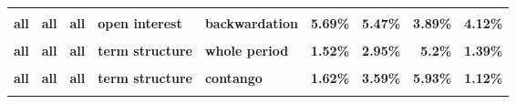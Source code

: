 \documentclass[
  authoryear,
  preprint,
  3p]{elsarticle}
\begin{document}
\begin{landscape}
\begin{longtable}[t]{>{}l>{}l>{}l>{}l>{}l>{}r>{}r>{}r>{}r}
\textbf{\cellcolor{gray!10}{all}} & \textbf{\cellcolor{gray!10}{all}} & \textbf{\cellcolor{gray!10}{all}} & \textbf{\cellcolor{gray!10}{open interest}} & \textbf{\cellcolor{gray!10}{whole period}} & \textcolor[HTML]{4285f4}{\textbf{\cellcolor{gray!10}{5.98\%}}} & \textcolor[HTML]{4285f4}{\textbf{\cellcolor{gray!10}{5.63\%}}} & \textcolor[HTML]{4285f4}{\textbf{\cellcolor{gray!10}{4.09\%}}} & \textcolor[HTML]{4285f4}{\textbf{\cellcolor{gray!10}{4.32\%}}}\\
\textbf{all} & \textbf{all} & \textbf{all} & \textbf{open interest} & \textbf{backwardation} & \textcolor[HTML]{4285f4}{\textbf{5.69\%}} & \textcolor[HTML]{4285f4}{\textbf{5.47\%}} & \textcolor[HTML]{4285f4}{\textbf{3.89\%}} & \textcolor[HTML]{4285f4}{\textbf{4.12\%}}\\
\textbf{\cellcolor{gray!10}{all}} & \textbf{\cellcolor{gray!10}{all}} & \textbf{\cellcolor{gray!10}{all}} & \textbf{\cellcolor{gray!10}{open interest}} & \textbf{\cellcolor{gray!10}{contango}} & \textcolor[HTML]{4285f4}{\textbf{\cellcolor{gray!10}{6.41\%}}} & \textcolor[HTML]{4285f4}{\textbf{\cellcolor{gray!10}{6.21\%}}} & \textcolor[HTML]{4285f4}{\textbf{\cellcolor{gray!10}{4.73\%}}} & \textcolor[HTML]{4285f4}{\textbf{\cellcolor{gray!10}{4.74\%}}}\\
\textbf{all} & \textbf{all} & \textbf{all} & \textbf{term structure} & \textbf{whole period} & \textcolor[HTML]{4285f4}{\textbf{1.52\%}} & \textcolor[HTML]{4285f4}{\textbf{2.95\%}} & \textcolor[HTML]{4285f4}{\textbf{5.2\%}} & \textcolor[HTML]{4285f4}{\textbf{1.39\%}}\\
\addlinespace
\textbf{\cellcolor{gray!10}{all}} & \textbf{\cellcolor{gray!10}{all}} & \textbf{\cellcolor{gray!10}{all}} & \textbf{\cellcolor{gray!10}{term structure}} & \textbf{\cellcolor{gray!10}{backwardation}} & \textcolor[HTML]{4285f4}{\textbf{\cellcolor{gray!10}{1.87\%}}} & \textcolor[HTML]{4285f4}{\textbf{\cellcolor{gray!10}{2.7\%}}} & \textcolor[HTML]{4285f4}{\textbf{\cellcolor{gray!10}{4.56\%}}} & \textcolor[HTML]{4285f4}{\textbf{\cellcolor{gray!10}{2.3\%}}}\\
\textbf{all} & \textbf{all} & \textbf{all} & \textbf{term structure} & \textbf{contango} & \textcolor[HTML]{4285f4}{\textbf{1.62\%}} & \textcolor[HTML]{4285f4}{\textbf{3.59\%}} & \textcolor[HTML]{4285f4}{\textbf{5.93\%}} & \textcolor[HTML]{4285f4}{\textbf{1.12\%}}\\
\textbf{\cellcolor{gray!10}{US}} & \textbf{\cellcolor{gray!10}{all}} & \textbf{\cellcolor{gray!10}{all}} & \textbf{\cellcolor{gray!10}{market}} & \textbf{\cellcolor{gray!10}{whole period}} & \textcolor[HTML]{4285f4}{\textbf{\cellcolor{gray!10}{11.67\%}}} & \textcolor[HTML]{4285f4}{\textbf{\cellcolor{gray!10}{21.7\%}}} & \textcolor[HTML]{4285f4}{\textbf{\cellcolor{gray!10}{30.69\%}}} & \textcolor[HTML]{4285f4}{\textbf{\cellcolor{gray!10}{15.73\%}}}\\

\end{longtable}
\end{landscape}
\end{document}
